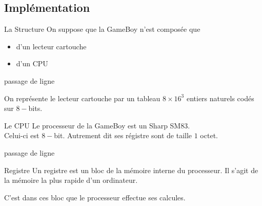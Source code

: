 \documentclass{beamer}
\begin{document}
    \subsection{Implémentation}
    \begin{frame}{La Structure}
        On suppose que la GameBoy n'est composée que
        \begin{itemize}
            \item d'un lecteur cartouche
            \item d'un CPU
        \end{itemize}

        {\color{white} passage de ligne}

        On représente le lecteur cartouche par un tableau $8 \times 16^3$ entiers naturels codés sur $8-$bits.
    \end{frame}

    \begin{frame}{Le CPU}
        Le processeur de la GameBoy est un Sharp SM83.\\
        Celui-ci est $8-$bit. Autrement dit ses régistre sont de taille $1$ octet.
        
        {\color{white} passage de ligne}

        \begin{block}{Registre}
            Un registre est un bloc de la mémoire interne du processeur.
            Il s'agit de la mémoire la plus rapide d'un ordinateur.
        \end{block}
        C'est dans ces bloc que le processeur effectue ses calcules.
    \end{frame}
\end{document}
